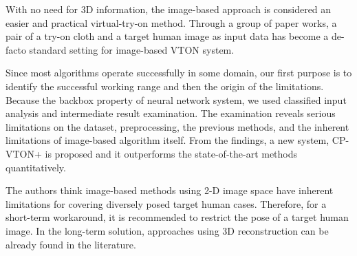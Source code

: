\documentclass[runningheads]{llncs}
\begin{document}
With no need for 3D information, the image-based approach is considered an easier and practical virtual-try-on method. Through a group of paper works, a pair of a try-on cloth and a target human image as input data has become a de-facto standard setting for image-based VTON system.   

Since most algorithms operate successfully in some domain, our first purpose is to identify the successful working range and then the origin of the limitations. Because the backbox property of neural network system, we used classified input analysis and intermediate result examination. The examination reveals serious limitations on the dataset, preprocessing, the previous methods, and the inherent limitations of image-based algorithm itself. From the findings, a new system, CP-VTON+ is proposed and it outperforms the state-of-the-art methods quantitatively.

The authors think image-based methods using 2-D image space have inherent limitations for covering diversely posed target human cases. Therefore, for a short-term workaround, it is recommended to restrict the pose of a target human image. In the long-term solution, approaches using 3D reconstruction \cite{natsume2019siclope,zanfir2018human} can be already found in the literature. 




\end{document}
